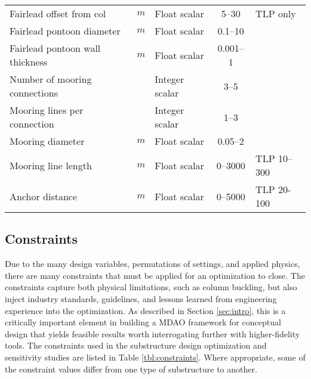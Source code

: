 \begin{table}[htbp]
\begin{center}
{\begin{tabular}{ l c l c l }
    Fairlead offset from col & \unit{$m$} & Float scalar & 5--30 & TLP only\\
    Fairlead pontoon diameter & \unit{$m$} & Float scalar & 0.1--10 &\\
    Fairlead pontoon wall thickness & \unit{$m$} & Float scalar &0.001--1 &\\
    Number of mooring connections && Integer scalar &3--5 &\\
    Mooring lines per connection && Integer scalar &1--3 &\\
    Mooring diameter & \unit{$m$} & Float scalar &0.05--2 &\\
    Mooring line length & \unit{$m$} & Float scalar &0--3000 &TLP 10--300\\
    Anchor distance & \unit{$m$} & Float scalar &0--5000 & TLP 20-100\\
  \hline \end{tabular}
}
\end{center} \end{table}


\subsection{Constraints}
Due to the many design variables, permutations of settings, and applied
physics, there are many constraints that must be applied for an
optimization to close.  The constraints capture both physical
limitations, such as column buckling, but also inject industry
standards, guidelines, and lessons learned from engineering experience
into the optimization.  As described in Section \ref{sec:intro}, this is
a critically important element in building a MDAO framework for
conceptual design that yields feasible results worth interrogating
further with higher-fidelity tools.  The constraints used in the
substructure design optimization and sensitivity studies are listed in
Table \ref{tbl:constraints}.  Where appropriate, some of the constraint
values differ from one type of substructure to another.

